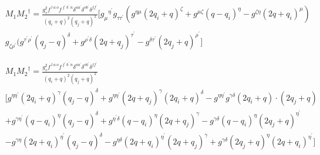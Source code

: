 \begin{equation}
\begin{split}
&M_1{M_2}^{\dagger}=\frac{g_s^2 f^{\:l\:a\:o} f^{\:f^{\prime}\: b^{\prime}\:n} \delta^{aa^{\prime}} \delta^{ob^{\prime}} \delta^{ff^{\prime}}}{(q_i +q)^2 (q_j +q)^2}
[{g_{{\mu}}}^{{\eta}^{\prime}} g_{{\tau}{{\tau}^{\prime}}}(g^{{\eta}{\mu}}(2q_i+q)^{\zeta}+g^{{\mu}{\zeta}}(q -q_i)^{\eta}-g^{{\zeta}{\eta}}(2q +q_i)^{\mu})\\
&g_{{{\zeta}}{{\rho}^{\prime}}}(g^{{{\tau}^{\prime}}{{\rho}^{\prime}}}(q_j-q)^{{\delta}}+g^{{{\rho}^{\prime}}{{\delta}}}(2q +q_j)^{{\tau}^{\prime}}-g^{{{\delta}}{{\tau}^{\prime}}}(2q_j+q)^{{\rho}^{\prime}}]
\end{split}
\end{equation}


\begin{equation}
\begin{split}
&M_1{M_2}^{\dagger}=\frac{g_s^2 f^{\:l\:a\:o} f^{\:f^{\prime}\: b^{\prime}\:n} \delta^{aa^{\prime}} \delta^{ob^{\prime}}\delta^{ff^{\prime}}}{(q_i +q)^2 (q_j +q)^2}\\
&[g^{{{\eta}}{{\eta}^{\prime}}}(2q_i+q)^{\gamma}(q_j-q)^{{\delta}}+g^{{{\eta}}{{\eta}^{\prime}}}(2q +q_j)^{\gamma}(2q_i+q)^{{\delta}}-g^{{{\eta}}{{\eta}^{\prime}}}g^{{{\gamma}}{{\delta}}}(2q_i+q)\cdot (2q_j+q)\\
&+g^{{{\gamma}}{{\eta}^{\prime}}}(q -q_i)^{\eta}(q_j-q)^{{\delta}}+g^{{{\eta}^{\prime}}{{\delta}}}(q -q_i)^{\eta}(2q +q_j)^{{\gamma}}
-g^{{{\gamma}}{{\delta}}}(q -q_i)^{\eta}(2q_j+q)^{{\eta}^{\prime}}\\
&-g^{{{\gamma}}{{\eta}}}(2q +q_i)^{{\eta}^{\prime}}(q_j-q)^{{\delta}}
-g^{{{\eta}}{{\delta}}}(2q +q_i)^{{\eta}^{\prime}}(2q +q_j)^{{\gamma}}
+g^{{{\gamma}}{{\delta}}}(2q_j+q)^{{\eta}}(2q +q_i)^{{\eta}^{\prime}}]\\
\end{split}
\end{equation}


